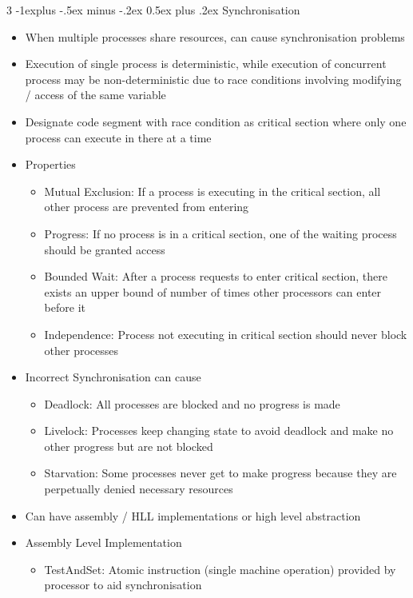 \documentclass[10pt, landscape]{article}
\makeatletter
\renewcommand{\section}{\@startsection{section}{1}{0mm}%
                                {-1ex plus -.5ex minus -.2ex}%
                                {0.5ex plus .2ex}%
                                {\normalfont\large\bfseries}}
\renewcommand{\section}{\@startsection{section}{2}{0mm}%
                                {-1explus -.5ex minus -.2ex}%
                                {0.5ex plus .2ex}%
                                {\normalfont\normalsize\bfseries}}
\makeatother
\begin{document}
\begin{multicols*}{3}
\section{Synchronisation}
\begin{itemize}
    \item When multiple processes share resources, can cause synchronisation problems
    \item Execution of single process is deterministic, while execution of concurrent process may be non-deterministic due to race conditions involving modifying / access of the same variable
    \item Designate code segment with race condition as critical section where only one process can execute in there at a time
    \item Properties
    \begin{itemize}
        \item Mutual Exclusion: If a process is executing in the critical section, all other process are prevented from entering
        \item Progress: If no process is in a critical section, one of the waiting process should be granted access
        \item Bounded Wait: After a process requests to enter critical section, there exists an upper bound of number of times other processors can enter before it
        \item Independence: Process not executing in critical section should never block other processes
    \end{itemize}
    \item Incorrect Synchronisation can cause
    \begin{itemize}
        \item Deadlock: All processes are blocked and no progress is made
        \item Livelock: Processes keep changing state to avoid deadlock and make no other progress but are not blocked
        \item Starvation: Some processes never get to make progress because they are perpetually denied necessary resources
    \end{itemize}
    \item Can have assembly / HLL implementations or high level abstraction
    \item Assembly Level Implementation
    \begin{itemize}
        \item TestAndSet: Atomic instruction (single machine operation) provided by processor to aid synchronisation

\end{itemize}
\end{itemize}
\end{multicols*}
\end{document}

